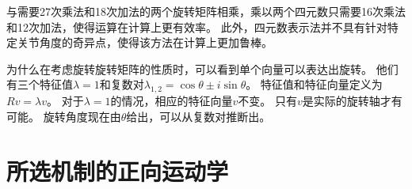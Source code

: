 
与需要27次乘法和18次加法的两个旋转矩阵相乘，乘以两个四元数只需要16次乘法和12次加法，使得运算在计算上更有效率。 此外，四元数表示法并不具有针对特定关节角度的奇异点，使得该方法在计算上更加鲁棒。


为什么在考虑旋转旋转矩阵的性质时，可以看到单个向量可以表达出旋转。 他们有三个特征值$ \lambda = 1 $和复数对$ \lambda_ {1,2} = \cos \theta \pm i \sin \theta $。 特征值和特征向量定义为$ Rv = \lambda v $。 对于$ \lambda = 1 $的情况，相应的特征向量$ v $不变。 只有$ v $是实际的旋转轴才有可能。 旋转角度现在由$ \theta $给出，可以从复数对推断出。

\section{所选机制的正向运动学}


